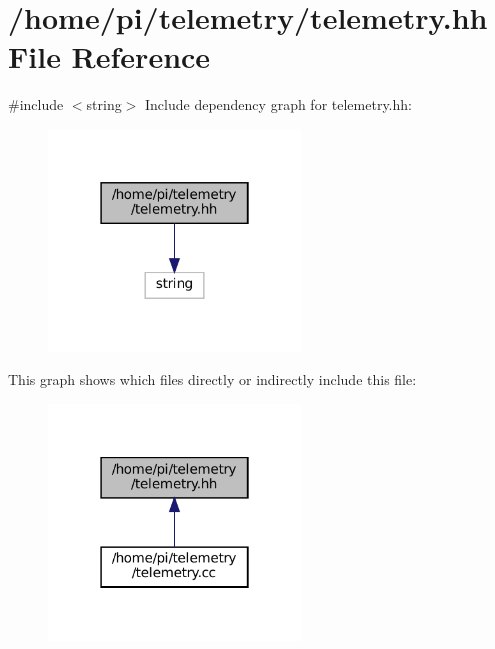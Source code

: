 \hypertarget{telemetry_8hh}{}\section{/home/pi/telemetry/telemetry.hh File Reference}
\label{telemetry_8hh}
{\ttfamily \#include $<$string$>$}\newline
Include dependency graph for telemetry.\+hh\+:\nopagebreak
\begin{figure}[H]
\begin{center}
\leavevmode
\includegraphics[width=190pt]{telemetry_8hh__incl}
\end{center}
\end{figure}
This graph shows which files directly or indirectly include this file\+:
\nopagebreak
\begin{figure}[H]
\begin{center}
\leavevmode
\includegraphics[width=190pt]{telemetry_8hh__dep__incl}
\end{center}
\end{figure}

